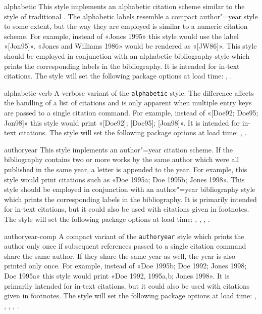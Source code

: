 \begin{marglist}
\item[alphabetic]
This style implements an alphabetic citation scheme similar to the  style of traditional \bibtex. The alphabetic labels resemble a compact author"=year style to some extent, but the way they are employed is similar to a numeric citation scheme. For example, instead of «Jones 1995» this style would use the label «[Jon95]». «Jones and Williams 1986» would be rendered as «[JW86]». This style should be employed in conjunction with an alphabetic bibliography style which prints the corresponding labels in the bibliography. It is intended for in-text citations. The style will set the following package options at load time: , .

\item[alphabetic-verb]
A verbose variant of the \texttt{alphabetic} style. The difference affects the handling of a list of citations and is only apparent when multiple entry keys are passed to a single citation command. For example, instead of «[Doe92; Doe95; Jon98]» this style would print «[Doe92]; [Doe95]; [Jon98]». It is intended for in-text citations. The style will set the following package options at load time: , .

\item[authoryear]
This style implements an author"=year citation scheme. If the bibliography contains two or more works by the same author which were all published in the same year, a letter is appended to the year. For example, this style would print citations such as «Doe 1995a; Doe 1995b; Jones 1998». This style should be employed in conjunction with an author"=year bibliography style which prints the corresponding labels in the bibliography. It is primarily intended for in-text citations, but it could also be used with citations given in footnotes. The style will set the following package options at load time: , , , .

\item[authoryear-comp]
A compact variant of the \texttt{authoryear} style which prints the author only once if subsequent references passed to a single citation command share the same author. If they share the same year as well, the year is also printed only once. For example, instead of «Doe 1995b; Doe 1992; Jones 1998; Doe 1995a» this style would print «Doe 1992, 1995a,b; Jones 1998». It is primarily intended for in-text citations, but it could also be used with citations given in footnotes. The style will set the following package options at load time: , , , , .


\end{marglist}
